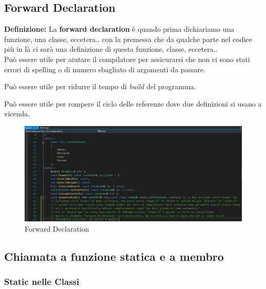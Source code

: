 \subsection{Forward Declaration}

\textsf{\small \textbf{Definizione: } La \textbf{forward declaration} è quando prima dichiariamo una funzione, una classe, eccetera.. con la premessa che da qualche parte nel codice più in là ci sarà una definizione di questa funzione, classe, eccetera..} \\

\textsf{\small Può essere utile per aiutare il compilatore per assicurarsi che non ci sono stati errori di spelling o di numero sbagliato di argomenti da passare.} 

\textsf{\small Può essere utile per ridurre il tempo di \emph{build} del programma.}

\textsf{\small Può essere utile per rompere il ciclo delle referenze dove due definizioni si usano a vicenda.} \\

\begin{figure}[H]
	\centering
	\includegraphics[width=1.2\textwidth, height=1.2\textheight, keepaspectratio]{./imgs/Forward_declaration.png}
	\caption{Forward Declaration}
	\label{fig:forward_declaration}
\end{figure}


\subsection{Chiamata a funzione statica e a membro} 

\subsubsection{Static nelle Classi}

